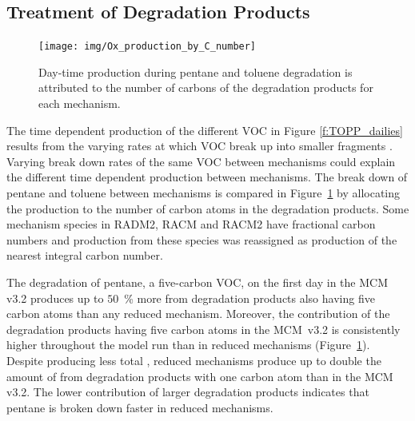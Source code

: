 \subsection{Treatment of Degradation Products} \label{ss:products} 
%
\begin{figure}
    \centering
    \texttt{[image: img/Ox\_production\_by\_C\_number]}
    \vspace{0mm}
    \caption{Day-time  production during pentane and toluene degradation is attributed to the number of carbons of the degradation products for each mechanism.}
    \vspace{-4mm}
    \label{f:carbon}
\end{figure}
%
The time dependent  production of the different VOC in Figure \ref{f:TOPP_dailies} results from the varying rates at which VOC break up into smaller fragments \citep{Butler:2011}.
Varying break down rates of the same VOC between mechanisms could explain the different time dependent  production between mechanisms.
The break down of pentane and toluene between mechanisms is compared in \mbox{Figure \ref{f:carbon}} by allocating the  production to the number of carbon atoms in the degradation products.
Some mechanism species in RADM2, RACM and RACM2 have fractional carbon numbers \citep{Stockwell:1990, Stockwell:1997, Goliff:2013} and  production from these species was reassigned as  production of the nearest integral carbon number.  

The degradation of pentane, a five-carbon VOC, on the first day in the MCM v3.2 produces up to \mbox{$50$ \%} more  from degradation products also having five carbon atoms than any reduced mechanism.
Moreover, the contribution of the degradation products having five carbon atoms in the \mbox{MCM v3.2} is consistently higher throughout the model run than in reduced mechanisms \mbox{(Figure \ref{f:carbon}).}
Despite producing less total , reduced mechanisms produce up to double the amount of  from degradation products with one carbon atom than in the MCM v3.2.
The lower contribution of larger degradation products indicates that pentane is broken down faster in reduced mechanisms.

